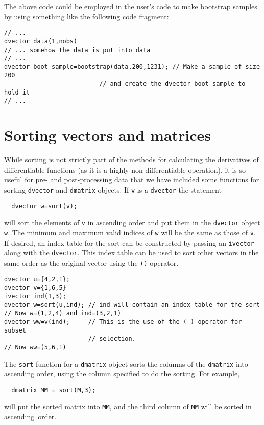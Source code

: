 \documentclass{admbmanual}
\begin{document}
The above  code could be employed in the user's code 
to make bootstrap samples by using something like the 
following code fragment:
\begin{lstlisting}
// ...
dvector data(1,nobs)
// ... somehow the data is put into data
// ...
dvector boot_sample=bootstrap(data,200,1231); // Make a sample of size 200
                          // and create the dvector boot_sample to hold it
// ...
\end{lstlisting}


\section{Sorting vectors and matrices}

While sorting is not strictly part of the methods for calculating the
derivatives of differentiable functions (as it is a highly non-differentiable
operation), it is so useful for pre- and post-processing data that we
have included some functions for sorting \texttt{dvector} and \texttt{dmatrix}
objects. If \texttt{v} is a \texttt{dvector} the statement
\begin{lstlisting}
  dvector w=sort(v);
\end{lstlisting}
will sort the elements of \texttt{v} in ascending order and 
put them in the \texttt{dvector} object \texttt{w}. The minimum and
maximum valid indices of \texttt{w} will be the same as those of \texttt{v}.
If desired, an index table for the sort can be constructed by passing
an \texttt{ivector} along with the \texttt{dvector}. This index table can be
used to sort other vectors in the same order as the original vector using the \texttt{()} operator.
\begin{lstlisting}
dvector u={4,2,1};
dvector v={1,6,5}
ivector ind(1,3);
dvector w=sort(u,ind); // ind will contain an index table for the sort
// Now w=(1,2,4) and ind=(3,2,1)
dvector ww=v(ind);     // This is the use of the ( ) operator for subset
                       // selection. 
// Now ww=(5,6,1)
\end{lstlisting}

The \texttt{sort} function for a \texttt{dmatrix} object sorts the columns of the
\texttt{dmatrix} into ascending order, using the column specified to do the
sorting. For example,
\begin{lstlisting}
  dmatrix MM = sort(M,3);
\end{lstlisting}
will put the sorted matrix into \texttt{MM}, and the third column of
\texttt{MM} will be sorted in ascending~\mbox{order}.
\end{document}
